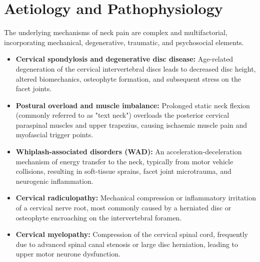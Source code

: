 \section*{Aetiology and Pathophysiology}
The underlying mechanisms of neck pain are complex and multifactorial, incorporating mechanical, degenerative, traumatic, and psychosocial elements.
\begin{itemize}
    \item \textbf{Cervical spondylosis and degenerative disc disease:} Age-related degeneration of the cervical intervertebral discs leads to decreased disc height, altered biomechanics, osteophyte formation, and subsequent stress on the facet joints.
    \item \textbf{Postural overload and muscle imbalance:} Prolonged static neck flexion (commonly referred to as "text neck") overloads the posterior cervical paraspinal muscles and upper trapezius, causing ischaemic muscle pain and myofascial trigger points.
    \item \textbf{Whiplash-associated disorders (WAD):} An acceleration-deceleration mechanism of energy transfer to the neck, typically from motor vehicle collisions, resulting in soft-tissue sprains, facet joint microtrauma, and neurogenic inflammation.
    \item \textbf{Cervical radiculopathy:} Mechanical compression or inflammatory irritation of a cervical nerve root, most commonly caused by a herniated disc or osteophyte encroaching on the intervertebral foramen.
    \item \textbf{Cervical myelopathy:} Compression of the cervical spinal cord, frequently due to advanced spinal canal stenosis or large disc herniation, leading to upper motor neurone dysfunction.
\end{itemize}


